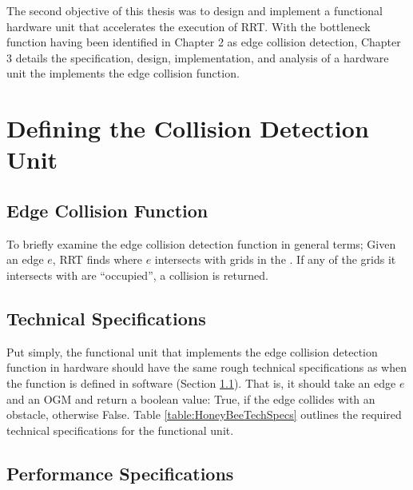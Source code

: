 
The second objective of this thesis was to design and implement a functional hardware unit that accelerates the execution of \gls{RRT}. With the bottleneck function having been identified in Chapter 2 as edge collision detection, Chapter 3 details the specification, design, implementation, and analysis of a hardware unit the implements the edge collision function.

\section{Defining the Collision Detection Unit}

    \subsection{Edge Collision Function}
    \label{subsection:EdgeCollisionFunction}
        To briefly examine the edge collision detection function in general terms; Given an edge $e$, \gls{RRT} finds where $e$ intersects with grids in the . If any of the grids it intersects with are ``occupied'', a collision is returned. 

        
   
    \subsection{Technical Specifications}
    \label{subsection:HoneyBeeTechSpechs}
        Put simply, the functional unit that implements the edge collision detection function in hardware should have the same rough technical specifications as when the function is defined in software (Section \ref{subsection:EdgeCollisionFunction}). That is, it should take an edge $e$ and an \gls{OGM} and return a boolean value: True, if the edge collides with an obstacle, otherwise False.
        Table \ref{table:HoneyBeeTechSpecs} outlines the required technical specifications for the functional unit.
        

    \subsection{Performance Specifications}
    \label{subsection:HoneyBeePerfSpechs}

